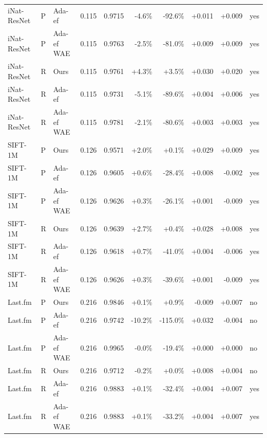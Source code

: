 \begin{tabular}{lllrrrrrrl}
iNat-ResNet & P & Ada-ef & 0.115 & 0.9715 & -4.6\% & -92.6\% & +0.011 & +0.009 & yes \\
iNat-ResNet & P & Ada-ef WAE & 0.115 & 0.9763 & -2.5\% & -81.0\% & +0.009 & +0.009 & yes \\
iNat-ResNet & R & Ours & 0.115 & 0.9761 & +4.3\% & +3.5\% & +0.030 & +0.020 & yes \\
iNat-ResNet & R & Ada-ef & 0.115 & 0.9731 & -5.1\% & -89.6\% & +0.004 & +0.006 & yes \\
iNat-ResNet & R & Ada-ef WAE & 0.115 & 0.9781 & -2.1\% & -80.6\% & +0.003 & +0.003 & yes \\
SIFT-1M & P & Ours & 0.126 & 0.9571 & +2.0\% & +0.1\% & +0.029 & +0.009 & yes \\
SIFT-1M & P & Ada-ef & 0.126 & 0.9605 & +0.6\% & -28.4\% & +0.008 & -0.002 & yes \\
SIFT-1M & P & Ada-ef WAE & 0.126 & 0.9626 & +0.3\% & -26.1\% & +0.001 & -0.009 & yes \\
SIFT-1M & R & Ours & 0.126 & 0.9639 & +2.7\% & +0.4\% & +0.028 & +0.008 & yes \\
SIFT-1M & R & Ada-ef & 0.126 & 0.9618 & +0.7\% & -41.0\% & +0.004 & -0.006 & yes \\
SIFT-1M & R & Ada-ef WAE & 0.126 & 0.9626 & +0.3\% & -39.6\% & +0.001 & -0.009 & yes \\
Last.fm & P & Ours & 0.216 & 0.9846 & +0.1\% & +0.9\% & -0.009 & +0.007 & no \\
Last.fm & P & Ada-ef & 0.216 & 0.9742 & -10.2\% & -115.0\% & +0.032 & -0.004 & no \\
Last.fm & P & Ada-ef WAE & 0.216 & 0.9965 & -0.0\% & -19.4\% & +0.000 & +0.000 & no \\
Last.fm & R & Ours & 0.216 & 0.9712 & -0.2\% & +0.0\% & +0.008 & +0.004 & no \\
Last.fm & R & Ada-ef & 0.216 & 0.9883 & +0.1\% & -32.4\% & +0.004 & +0.007 & yes \\
Last.fm & R & Ada-ef WAE & 0.216 & 0.9883 & +0.1\% & -33.2\% & +0.004 & +0.007 & yes \\
\bottomrule
\end{tabular}
